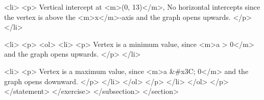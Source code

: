                         <li>
                            <p>
                                Vertical intercept at <m>(0, 13)</m>, No horizontal intercepts since the vertex is above the <m>x</m>-axis and the graph opens upwards.
                            </p>
                        </li>

                        <li>
                            <p>
                                <ol>
                                    <li>
                                        <p>
                                            Vertex is a minimum value, since <m>a > 0</m> and the graph opens upwards.
                                        </p>
                                    </li>

                                    <li>
                                        <p>
                                            Vertex is a maximum value, since <m>a &#x3C; 0</m> and the graph opens downward.
                                        </p>
                                    </li>
                                </ol>
                            </p>
                        </li>
                    </ol>
                </p>
            </statement>
        </exercise>
    </subsection>
</section>
